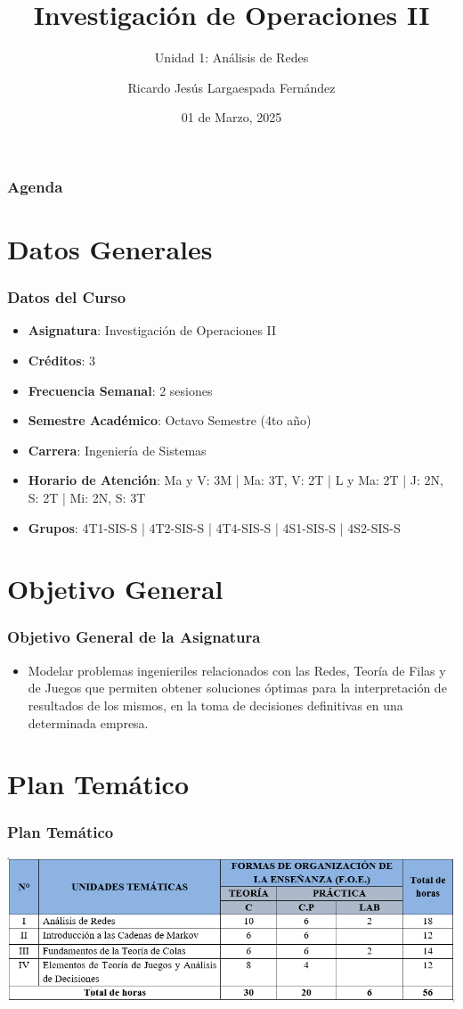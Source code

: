 \documentclass{beamer}
\title{Investigación de Operaciones II}
\subtitle{Unidad 1: Análisis de Redes}
\author[Ricardo Largaespada]{Ricardo Jesús Largaespada Fernández}
\institute[UNI]{Ingeniería de Sistemas, DACTIC, UNI}
\date{01 de Marzo, 2025}
\begin{document}
\frame{\titlepage}

\begin{frame}
\frametitle{Agenda}
\tableofcontents
\end{frame}

\section{Datos Generales}
\begin{frame}
\frametitle{Datos del Curso}
\begin{itemize}
    \item \textbf{Asignatura}: Investigación de Operaciones II
    \item \textbf{Créditos}: 3
    \item \textbf{Frecuencia Semanal}: 2 sesiones
    \item \textbf{Semestre Académico}: Octavo Semestre (4to año)
    \item \textbf{Carrera}: Ingeniería de Sistemas
    \item \textbf{Horario de Atención}: Ma y V: 3M | Ma: 3T, V: 2T | L y Ma: 2T | J: 2N, S: 2T | Mi: 2N, S: 3T
    \item \textbf{Grupos}: 4T1-SIS-S | 4T2-SIS-S | 4T4-SIS-S | 4S1-SIS-S | 4S2-SIS-S
\end{itemize}
\end{frame}

\section{Objetivo General}
\begin{frame}
\frametitle{Objetivo General de la Asignatura}
\begin{itemize}
    \item Modelar problemas ingenieriles relacionados con las Redes, Teoría de Filas y de Juegos que permiten obtener soluciones óptimas para la interpretación de resultados de los mismos, en la toma de decisiones definitivas en una determinada empresa.
\end{itemize}
\end{frame}

\section{Plan Temático}

\begin{frame}
\frametitle{Plan Temático}
\begin{center}
    \includegraphics[scale=.5]{images/plan_tematico.png}
\end{center}
\end{frame}
\end{document}
